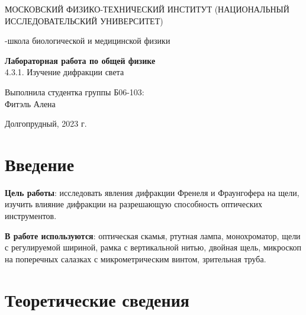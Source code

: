 \documentclass{article}
\begin{document}
\def\figurename{Рисунок}
\begin{titlepage}
\begin{center}
    {\large МОСКОВСКИЙ ФИЗИКО-ТЕХНИЧЕСКИЙ ИНСТИТУТ (НАЦИОНАЛЬНЫЙ ИССЛЕДОВАТЕЛЬСКИЙ УНИВЕРСИТЕТ)}
\end{center}
\begin{center}
    {-школа биологической и медицинской физики}
\end{center}

\vspace{1cm}
{\huge
\begin{center}
    {\bf Лабораторная работа по общей физике}\\
    \vspace{0.5cm}
    4.3.1. Изучение дифракции света 
\end{center}
}

\vspace{4cm}
\begin{flushright}
{\LARGE Выполнила студентка группы Б06-103:\\ Фитэль Алена \\}

\end{flushright}
\vspace{9cm}
\begin{center}
    Долгопрудный, 2023 г.
\end{center}
\end{titlepage}
\newpage
\section{Введение}
\textbf{Цель работы}: исследовать явления дифракции Френеля и Фраунгофера на щели, изучить влияние дифракции на разрешающую способность оптических инструментов.


\textbf{В работе используются}: оптическая скамья, ртутная лампа, монохроматор, щели с регулируемой шириной, рамка с вертикальной нитью, двойная щель, микроскоп на поперечных салазках с микрометрическим винтом, зрительная труба.

\section{Теоретические сведения}
\end{document}
